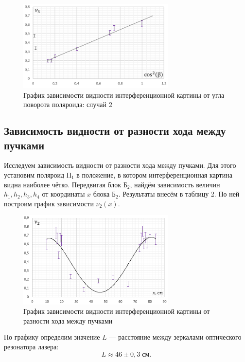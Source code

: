 \documentclass[a4paper]{article}
\begin{document}
\begin{figure}[ht!]
    \centering
    \includegraphics[width = 0.7\textwidth]{image/graph2.png}
    \caption{График зависимости видности интерференционной картины от угла поворота поляроида: случай 2}
\end{figure}

\subsection{Зависимость видности от разности хода между пучками}

Исследуем зависимость видности от разности хода между пучками. Для этого установим поляроид П$_1$ в положение, в котором интерференционная картина видна наиболее чётко. Передвигая блок Б$_2$, найдём зависимость величин  $h_1, h_2, h_3, h_4$ от координаты $x$ блока Б$_2$. Результаты внесём в таблицу 2. По ней построим график зависимости $\nu_2(x)$.

\begin{figure}[ht!]
    \centering
    \includegraphics[width = 0.7\textwidth]{image/graph3.png}
    \caption{График зависимости видности интерференционной картины от разности хода между пучками}
\end{figure}

\noindent По графику определим значение $L$ --- расстояние между зеркалами оптического резонатора лазера: $$L \approx 46 \pm 0,3 \; \text{см}.$$
\end{document}

